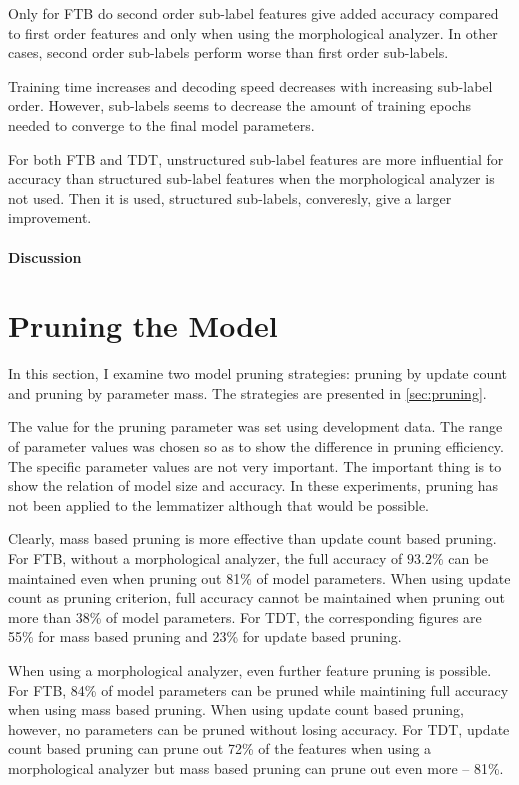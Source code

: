 Only for FTB do second order sub-label features give added accuracy
compared to first order features and only when using the morphological
analyzer. In other cases, second order sub-labels perform worse than
first order sub-labels.

Training time increases and decoding speed decreases with increasing
sub-label order. However, sub-labels seems to decrease the amount of
training epochs needed to converge to the final model parameters.

For both FTB and TDT, unstructured sub-label features are more
influential for accuracy than structured sub-label features when the
morphological analyzer is not used. Then it is used, structured
sub-labels, converesly, give a larger improvement.

\paragraph{Discussion}

\section{Pruning the Model}

In this section, I examine two model pruning strategies: pruning by
update count and pruning by parameter mass. The strategies are
presented in \ref{sec:pruning}.

The value for the pruning parameter was set using development
data. The range of parameter values was chosen so as to show the
difference in pruning efficiency. The specific parameter values are
not very important. The important thing is to show the relation of
model size and accuracy. In these experiments, pruning has not been
applied to the lemmatizer although that would be possible.

Clearly, mass based pruning is more effective than update count based
pruning. For FTB, without a morphological analyzer, the full accuracy
of $93.2\%$ can be maintained even when pruning out 81\% of model
parameters. When using update count as pruning criterion, full
accuracy cannot be maintained when pruning out more than 38\% of model
parameters. For TDT, the corresponding figures are 55\% for mass based
pruning and 23\% for update based pruning.

When using a morphological analyzer, even further feature pruning is
possible. For FTB, 84\% of model parameters can be pruned while
maintining full accuracy when using mass based pruning. When using
update count based pruning, however, no parameters can be pruned
without losing accuracy. For TDT, update count based pruning can prune
out 72\% of the features when using a morphological analyzer but mass
based pruning can prune out even more -- 81\%.

